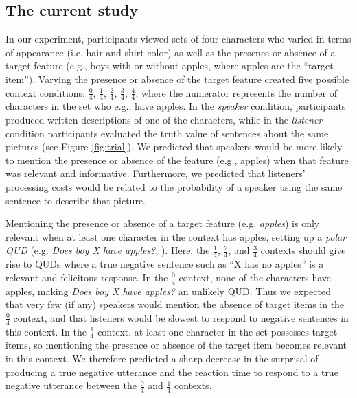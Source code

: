 \documentclass[man, floatsintext, noapacite]{apa6}
\begin{document}
\subsection{The current study}
In our experiment, participants viewed sets of four characters who varied in terms of appearance (i.e. hair and shirt color) as well as the presence or absence of a target feature (e.g., boys with or without apples, where apples are the ``target item''). Varying the presence or absence of the target feature created five possible context conditions: $\frac{0}{4}$, $\frac{1}{4}$, $\frac{2}{4}$, $\frac{3}{4}$, $\frac{4}{4}$, where the numerator represents the number of characters in the set who e.g., have apples. In the \textit{speaker} condition, participants produced written descriptions of one of the characters, while in the \textit{listener} condition participants evaluated the truth value of sentences about the same pictures (see Figure \ref{fig:trial}). We predicted that speakers would be more likely to mention the presence or absence of the feature (e.g., apples) when that feature was relevant and informative. Furthermore, we predicted that listeners' processing costs would be related to the probability of a speaker using the same sentence to describe that picture. 

Mentioning the presence or absence of a target feature (e.g. \textit{apples}) is only relevant when at least one character in the context has apples, setting up a \textit{polar QUD} (e.g. \textit{Does boy X have apples?}; ). Here, the $\frac{1}{4}$, $\frac{2}{4}$, and $\frac{3}{4}$ contexts should give rise to QUDs where a true negative sentence such as ``X has no apples'' is a relevant and felicitous response. In the $\frac{0}{4}$ context, none of the characters have apples, making \textit{Does boy X have apples?} an unlikely QUD. Thus we expected that very few (if any) speakers would mention the absence of target items in the $\frac{0}{4}$ context, and that listeners would be slowest to respond to negative sentences in this context. In the $\frac{1}{4}$ context, at least one character in the set possesses target items, so mentioning the presence or absence of the target item becomes relevant in this context. We therefore predicted a sharp decrease in the surprisal of producing a true negative utterance and the reaction time to respond to a true negative utterance between the $\frac{0}{4}$ and $\frac{1}{4}$ contexts.
\end{document}
